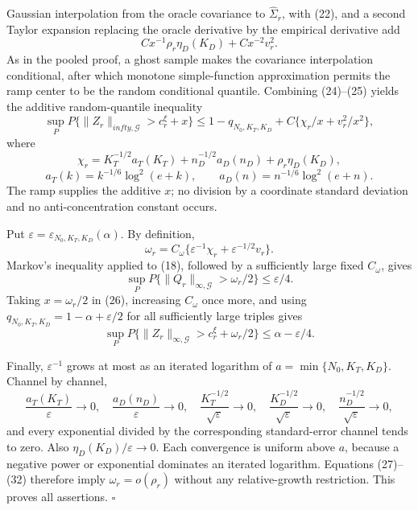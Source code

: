 Gaussian interpolation from the oracle covariance to
\(\widehat\Sigma_r\), with (22), and a second Taylor expansion replacing
the oracle derivative by the empirical derivative add
\[
 Cx^{-1}\rho_r\eta_D(K_D)+Cx^{-2}v_r^2.                  \tag{25}
\]
As in the pooled proof, a ghost sample makes the covariance interpolation
conditional, after which monotone simple-function approximation permits
the ramp center to be the random conditional quantile.  Combining
(24)--(25) yields the additive random-quantile inequality
\[
 \sup_PP\{\|Z_r\|_{infty,\mathcal G}>c_r^\xi+x\}
 \le1-q_{N_0,K_T,K_D}+C\{\chi_r/x+v_r^2/x^2\},           \tag{26}
\]
where
\[
 \chi_r=K_T^{-1/2}a_T(K_T)+n_D^{-1/2}a_D(n_D)
          +\rho_r\eta_D(K_D),                              \tag{27}
\]
\[
 a_T(k)=k^{-1/6}\log^2(e+k),
 \qquad a_D(n)=n^{-1/6}\log^2(e+n).                       \tag{28}
\]
The ramp supplies the additive \(x\); no division by a coordinate standard
deviation and no anti-concentration constant occurs.

Put \(\varepsilon=\varepsilon_{N_0,K_T,K_D}(\alpha)\).  By definition,
\[
 \omega_r=C_\omega\{\varepsilon^{-1}\chi_r
                    +\varepsilon^{-1/2}v_r\}.              \tag{29}
\]
Markov's inequality applied to (18), followed by a sufficiently large
fixed \(C_\omega\), gives
\[
 \sup_PP\{\|Q_r\|_{\infty,\mathcal G}>\omega_r/2\}
 \le\varepsilon/4.                                         \tag{30}
\]
Taking \(x=\omega_r/2\) in (26), increasing \(C_\omega\) once more, and
using \(q_{N_0,K_T,K_D}=1-\alpha+\varepsilon/2\) for all sufficiently
large triples gives
\[
 \sup_PP\{\|Z_r\|_{\infty,\mathcal G}>c_r^\xi+\omega_r/2\}
 \le\alpha-\varepsilon/4.                                 \tag{31}
\]

Finally, \(\varepsilon^{-1}\) grows at most as an iterated logarithm of
\(a=\min\{N_0,K_T,K_D\}\).  Channel by channel,
\[
 \frac{a_T(K_T)}{\varepsilon}\to0,
 \quad \frac{a_D(n_D)}{\varepsilon}\to0,
 \quad \frac{K_T^{-1/2}}{\sqrt\varepsilon}\to0,
 \quad \frac{K_D^{-1/2}}{\sqrt\varepsilon}\to0,
 \quad \frac{n_D^{-1/2}}{\sqrt\varepsilon}\to0,          \tag{32}
\]
and every exponential divided by the corresponding standard-error channel
tends to zero.  Also \(\eta_D(K_D)/\varepsilon\to0\).  Each convergence is
uniform above \(a\), because a negative power or exponential dominates an
iterated logarithm.  Equations (27)--(32) therefore imply
\(\omega_r=o(\rho_r)\) without any relative-growth restriction.  This
proves all assertions. \(\square\)